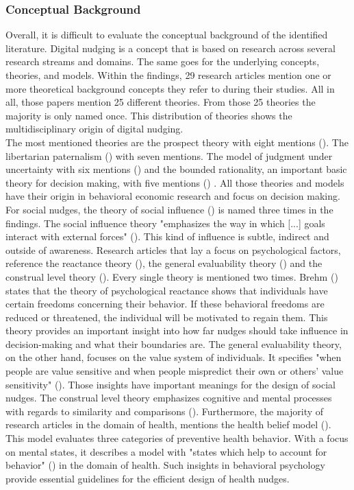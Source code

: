 \subsubsection{Conceptual Background} 
Overall, it is difficult to evaluate the conceptual background of the identified literature. Digital nudging is a concept that is based on research across several research streams and domains. The same goes for the underlying concepts, theories, and models. Within the findings, 29 research articles mention one or more theoretical background concepts they refer to during their studies. All in all, those papers mention 25 different theories. From those 25 theories the majority is only named once. This distribution of theories shows the multidisciplinary origin of digital nudging.
\\

The most mentioned theories are the prospect theory with eight mentions (\cite{kahneman_prospect_1979}). The libertarian paternalism (\cite{thaler_nudge:_2009}) with seven mentions. The model of judgment under uncertainty with six mentions (\cite{tversky_judgment_1974}) and the bounded rationality, an important basic theory for decision making, with five mentions (\cite{simon_behavioral_1955}) . All those theories and models have their origin in behavioral economic research and focus on decision making.
For social nudges, the theory of social influence (\cite{cialdini_social_2004}) is named three times in the findings. The social influence theory "emphasizes the way in which [...] goals interact with external forces" (\cite[p.591]{cialdini_social_2004}). This kind of influence is subtle, indirect and outside of awareness.
Research articles that lay a focus on psychological factors, reference the reactance theory (\cite{brehm_theory_1966}), the general evaluability theory (\cite{hsee_general_2010}) and the construal level theory (\cite{trope_construal-level_2010}). Every single theory is mentioned two times. Brehm (\citeyear{brehm_theory_1966}) states that the theory of psychological reactance shows that individuals have certain freedoms concerning their behavior. If these behavioral freedoms are reduced or threatened, the individual will be motivated to regain them. This theory provides an important insight into how far nudges should take influence in decision-making and what their boundaries are. The general evaluability theory, on the other hand, focuses on the value system of individuals. It specifies "when people are value sensitive and when people mispredict their own or others' value sensitivity" (\cite[p.343]{hsee_general_2010}). Those insights have important meanings for the design of social nudges. The construal level theory emphasizes cognitive and mental processes with regards to similarity and comparisons (\cite{trope_construal-level_2010}).
Furthermore, the majority of research articles in the domain of health, mentions the health belief model (\cite{rosenstock_health_1974}). This model evaluates three categories of preventive health behavior. With a focus on mental states, it describes a model with "states which help to account for behavior" (\cite[p.354]{rosenstock_health_1974}) in the domain of health. Such insights in behavioral psychology provide essential guidelines for the efficient design of health nudges. 


